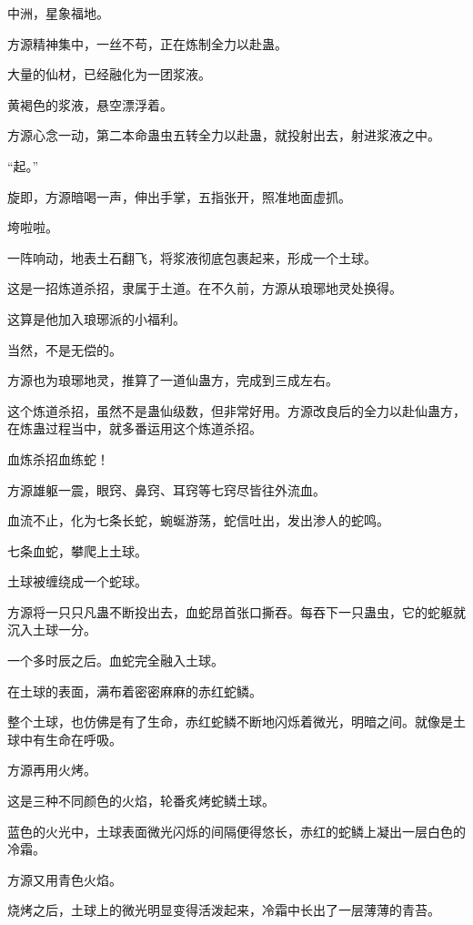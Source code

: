 
\begin{this_body}

中洲，星象福地。

方源精神集中，一丝不苟，正在炼制全力以赴蛊。

大量的仙材，已经融化为一团浆液。

黄褐色的浆液，悬空漂浮着。

方源心念一动，第二本命蛊虫五转全力以赴蛊，就投射出去，射进浆液之中。

“起。”

旋即，方源暗喝一声，伸出手掌，五指张开，照准地面虚抓。

垮啦啦。

一阵响动，地表土石翻飞，将浆液彻底包裹起来，形成一个土球。

这是一招炼道杀招，隶属于土道。在不久前，方源从琅琊地灵处换得。

这算是他加入琅琊派的小福利。

当然，不是无偿的。

方源也为琅琊地灵，推算了一道仙蛊方，完成到三成左右。

这个炼道杀招，虽然不是蛊仙级数，但非常好用。方源改良后的全力以赴仙蛊方，在炼蛊过程当中，就多番运用这个炼道杀招。

血炼杀招血练蛇！

方源雄躯一震，眼窍、鼻窍、耳窍等七窍尽皆往外流血。

血流不止，化为七条长蛇，蜿蜒游荡，蛇信吐出，发出渗人的蛇鸣。

七条血蛇，攀爬上土球。

土球被缠绕成一个蛇球。

方源将一只只凡蛊不断投出去，血蛇昂首张口撕吞。每吞下一只蛊虫，它的蛇躯就沉入土球一分。

一个多时辰之后。血蛇完全融入土球。

在土球的表面，满布着密密麻麻的赤红蛇鳞。

整个土球，也仿佛是有了生命，赤红蛇鳞不断地闪烁着微光，明暗之间。就像是土球中有生命在呼吸。

方源再用火烤。

这是三种不同颜色的火焰，轮番炙烤蛇鳞土球。

蓝色的火光中，土球表面微光闪烁的间隔便得悠长，赤红的蛇鳞上凝出一层白色的冷霜。

方源又用青色火焰。

烧烤之后，土球上的微光明显变得活泼起来，冷霜中长出了一层薄薄的青苔。


\end{this_body}
